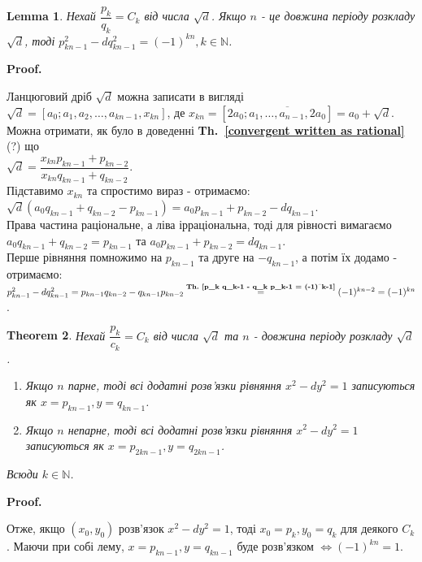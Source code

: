 \documentclass[a4paper, 10pt]{article}
\makeatletter
\theoremstyle{theoremdd}
\newtheorem{theorem}{Theorem}[subsection]
\theoremstyle{theoremdd}
\theoremstyle{theoremdd}
\theoremstyle{theoremdd}
\theoremstyle{theoremdd}
\theoremstyle{theoremdd}
\theoremstyle{theoremdd}
\newtheorem{lemma}[theorem]{Lemma}
\theoremstyle{theoremdd}
\renewenvironment{proof}[1][Proof.\\]{\par
\pushQED{\hfill \qed}%
\normalfont \topsep6\p@\@plus6\p@\relax
\trivlist
\item\relax
{\bfseries
#1\@addpunct{.}}\hspace\labelsep\ignorespaces
}{%
\popQED\endtrivlist\@endpefalse
}
\newcommand\thref[1]{\textbf{Th.~\ref{#1}}}
\makeatother
\begin{document}
\begin{lemma}
Нехай $\dfrac{p_k}{q_k} = C_k$ від числа $\sqrt{d}$. Якщо $n$ - це довжина періоду розкладу $\sqrt{d}$, тоді $p^2_{kn-1} - dq^2_{kn-1} = (-1)^{kn}, k \in \mathbb{N}$.
\end{lemma}

\begin{proof}
Ланцюговий дріб $\sqrt{d}$ можна записати в вигляді \\ $\sqrt{d} = [a_0; a_1,a_2,\dots, a_{kn-1}, x_{kn}]$, де $x_{kn} = [2a_0; \overline{a_1,\dots,a_{n-1}, 2a_0}] = a_0 + \sqrt{d}$. Можна отримати, як було в доведенні \thref{convergent written as rational} (?) що \\
$\sqrt{d} = \dfrac{x_{kn} p_{kn-1} + p_{kn-2}}{x_{kn} q_{kn-1} + q_{kn-2}}$.\\
Підставимо $x_{kn}$ та спростимо вираз - отримаємо:\\
$\sqrt{d} (a_0 q_{kn-1} + q_{kn-2} - p_{kn-1}) = a_0 p_{kn-1} + p_{kn-2} - dq_{kn-1}$.\\
Права частина раціональне, а ліва ірраціональна, тоді для рівності вимагаємо $a_0 q_{kn-1} + q_{kn-2} = p_{kn-1}$ та $a_0 p_{kn-1} + p_{kn-2} = dq_{kn-1}$.\\
Перше рівняння помножимо на $p_{kn-1}$ та друге на $-q_{kn-1}$, а потім їх додамо - отримаємо:\\
$p^2_{kn-1} - dq^2_{kn-1} = p_{kn-1}q_{kn-2} - q_{kn-1}p_{kn-2} \overset{\thref{p_k q_k-1 - q_k p_k-1 = (-1)^k-1}}{=} (-1)^{kn-2} = (-1)^{kn}$.
\end{proof}

\begin{theorem}
Нехай $\dfrac{p_k}{c_k} = C_k$ від числа $\sqrt{d}$ та $n$ - довжина періоду розкладу $\sqrt{d}$.
\begin{enumerate}
\item Якщо $n$ парне, тоді всі додатні розв'язки рівняння $x^2-dy^2 = 1$ записуються як $x = p_{kn-1}, y = q_{kn-1}$.

\item Якщо $n$ непарне, тоді всі додатні розв'язки рівняння $x^2-dy^2 = 1$ записуються як $x = p_{2kn-1}, y = q_{2kn-1}$.
\end{enumerate}
Всюди $k \in \mathbb{N}$.
\end{theorem}

\begin{proof}
Отже, якщо $(x_0,y_0)$ розв'язок $x^2 - dy^2 = 1$, тоді $x_0 = p_k, y_0 = q_k$ для деякого $C_k$. Маючи при собі лему, $x = p_{kn-1}, y = q_{kn-1}$ буде розв'язком $\iff (-1)^{kn} = 1$.
\end{proof}
\end{document}
